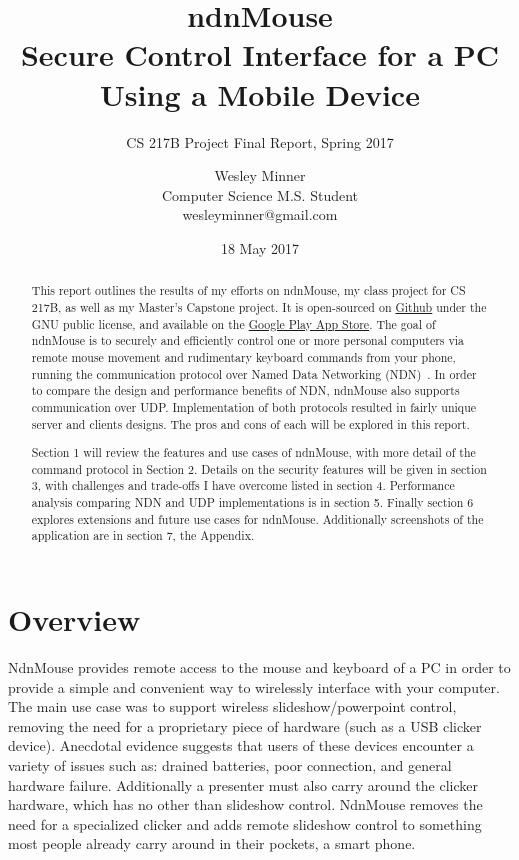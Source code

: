 \documentclass{sig-alternate}
\renewcommand\_{\textunderscore\allowbreak}  %
\begin{document}
	
\title{ndnMouse\\Secure Control Interface for a PC Using a Mobile Device}
\subtitle{CS 217B Project Final Report, Spring 2017}
\author{
	Wesley Minner\\
	Computer Science M.S. Student\\
	wesleyminner@gmail.com
}

\date{18 May 2017}
\maketitle

\begin{abstract}
This report outlines the results of my efforts on ndnMouse, my class project for CS 217B, as well as my Master's Capstone project. It is open-sourced on \href{https://github.com/wminner/ndnMouse}{Github} under the GNU public license, and available on the \href{https://play.google.com/store/apps/details?id=edu.ucla.cs.ndnmouse}{Google Play App Store}. The goal of ndnMouse is to securely and efficiently control one or more personal computers via remote mouse movement and rudimentary keyboard commands from your phone, running the communication protocol over Named Data Networking (NDN)~\cite{ndn}. In order to compare the design and performance benefits of NDN, ndnMouse also supports communication over UDP. Implementation of both protocols resulted in fairly unique server and clients designs. The pros and cons of each will be explored in this report.

Section 1 will review the features and use cases of ndnMouse, with more detail of the command protocol in Section 2. Details on the security features will be given in section 3, with challenges and trade-offs I have overcome listed in section 4. Performance analysis comparing NDN and UDP implementations is in section 5. Finally section 6 explores extensions and future use cases for ndnMouse. Additionally screenshots of the application are in section 7, the Appendix.
\end{abstract}


\section{Overview}
NdnMouse provides remote access to the mouse and keyboard of a PC in order to provide a simple and convenient way to wirelessly interface with your computer. The main use case was to support wireless slideshow/powerpoint control, removing the need for a proprietary piece of hardware (such as a USB clicker device). Anecdotal evidence suggests that users of these devices encounter a variety of issues such as: drained batteries, poor connection, and general hardware failure. Additionally a presenter must also carry around the clicker hardware, which has no other than slideshow control. NdnMouse removes the need for a specialized clicker and adds remote slideshow control to something most people already carry around in their pockets, a smart phone. 
\end{document}
